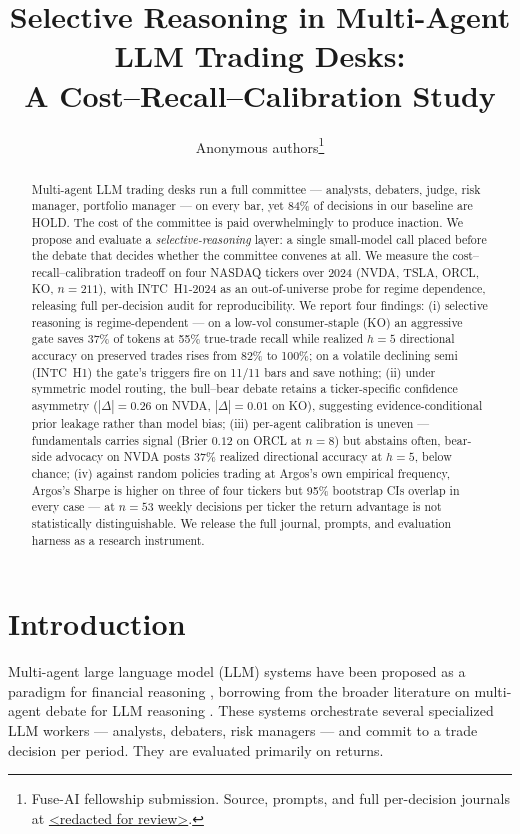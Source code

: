 \documentclass[11pt,a4paper]{article}
\title{\textbf{Selective Reasoning in Multi-Agent LLM Trading Desks:\\
A Cost--Recall--Calibration Study}}
\author{Anonymous authors\thanks{Fuse-AI fellowship submission.
Source, prompts, and full per-decision journals at \url{<redacted for review>}.}}
\date{}
\begin{document}
\maketitle

\begin{abstract}
Multi-agent LLM trading desks run a full committee --- analysts, debaters,
judge, risk manager, portfolio manager --- on every bar, yet 84\% of
decisions in our baseline are HOLD. The cost of the committee is paid
overwhelmingly to produce inaction. We propose and evaluate a
\emph{selective-reasoning} layer: a single small-model call placed before
the debate that decides whether the committee convenes at all. We
measure the cost--recall--calibration tradeoff on four NASDAQ tickers
over 2024 (NVDA, TSLA, ORCL, KO, $n{=}211$), with INTC~H1-2024 as an
out-of-universe probe for regime dependence, releasing full per-decision
audit for reproducibility. We report four findings: (i) selective
reasoning is regime-dependent --- on a low-vol consumer-staple (KO) an
aggressive gate saves 37\% of tokens at 55\% true-trade recall while
realized $h{=}5$ directional accuracy on preserved trades rises from
82\% to 100\%; on a volatile declining semi (INTC~H1) the gate's
triggers fire on 11/11 bars and save nothing; (ii) under symmetric
model routing, the bull--bear debate retains a ticker-specific
confidence asymmetry ($|\Delta|{=}0.26$ on NVDA, $|\Delta|{=}0.01$ on
KO), suggesting evidence-conditional prior leakage rather than model
bias; (iii) per-agent calibration is uneven --- fundamentals carries
signal (Brier $0.12$ on ORCL at $n{=}8$) but abstains often, bear-side
advocacy on NVDA posts $37\%$ realized directional accuracy at $h{=}5$,
below chance; (iv) against random policies trading at Argos's own
empirical frequency, Argos's Sharpe is higher on three of four tickers
but 95\% bootstrap CIs overlap in every case --- at $n{=}53$ weekly
decisions per ticker the return advantage is not statistically
distinguishable. We release the full journal, prompts, and evaluation
harness as a research instrument.
\end{abstract}

\section{Introduction}
\label{sec:intro}

Multi-agent large language model (LLM) systems have been proposed as a
paradigm for financial reasoning \citep{tradingagents, finagent, finmem},
borrowing from the broader literature on multi-agent debate for
LLM reasoning \citep{du2023debate, liang2023divergent}. These systems
orchestrate several specialized LLM workers --- analysts, debaters, risk
managers --- and commit to a trade decision per period. They are evaluated
primarily on returns.
\end{document}
